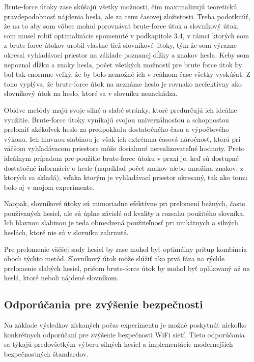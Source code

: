 \documentclass[12pt, twoside]{book}
\begin{document}
Brute-force útoky zase skúšajú všetky možnosti, čím maximalizujú teoretickú pravdepodobnosť nájdenia hesla, ale za cenu časovej zložistosti. Treba  podotknúť, že na to aby som vôbec mohol porovnávať brute-force útok a slovníkový útok, som musel robiť optimalizácie spomenuté v podkapitole 3.4, v rámci ktorých som z brute force útokov urobil vlastne tiež slovníkové útoky, tým že som výrazne okresal vyhľadávací priestor na základe poznanej dĺžky a znakov hesla. Keby som nepoznal dĺžku a znaky hesla, počet všetkých možností pre brute force útok by bol tak enormne veľký, že by bolo nemožné ich v reálnom čase všetky vyskúšať. Z toho vyplýva, že brute-force útok na neznáme heslo je rovnako neefektívny ako slovníkový útok na heslo, ktoré sa v slovníku nenachádza.

Obidve metódy majú svoje silné a slabé stránky, ktoré predurčujú ich ideálne využitie. Brute-force útoky vynikajú svojou univerzálnosťou a schopnosťou prelomiť akékoľvek heslo za predpokladu dostatočného času a výpočtového výkonu. Ich hlavnou slabinou je však ich extrémna časová náročnosť, ktorá pri väčšom vyhľadávacom priestore môže dosiahnuť nerealizovateľné hodnoty. Preto ideálnym prípadom pre použitie brute-force útoku v praxi je, keď sú dostupné dostatočné informácie o hesle (napríklad počet znakov alebo množina znakov, z ktorých sa skladá), vďaka ktorým je vyhľadávací priestor okresaný, tak ako tomu bolo aj v mojom experimente.

Naopak, slovníkové útoky sú mimoriadne efektívne pri prelomení bežných, často používaných hesiel, ale sú úplne závislé od kvality a rozsahu použitého slovníka. Ich hlavnou slabinou je teda obmedzená použiteľnosť pri unikátnych a silných heslách, ktoré nie sú v slovníku zahrnuté.

Pre prelomenie väčšej sady hesiel by zase mohol byť optimálny prítup kombincia oboch týchto metód. Slovníkový útok môže slúžiť ako prvá fáza na rýchle prelomenie slabých hesiel, pričom brute-force útok by mohol byť aplikovaný až na heslá, ktoré neboli nájdené slovníkom.


\subsection{Odporúčania pre zvýšenie bezpečnosti}
Na základe výsledkov získaných počas experimentu je možné poskytnúť niekoľko konkrétnych odporúčaní pre zvýšenie bezpečnosti WiFi sietí. Tieto odporúčania sa týkajú predovšetkým výberu silných hesiel a implementácie modernejších bezpečnostných štandardov.
\end{document}

